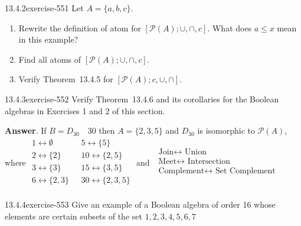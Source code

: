 \documentclass[twoside,10pt,]{book}
\numberwithin{equation}{section}
\begin{document}
\begin{divisionsolution}{13.4.2}{}{exercise-551}%
\hypertarget{p-4939}{}%
Let \(A = \{a, b, c\}\).\leavevmode%
\begin{enumerate}[label=(\alph*)]
\item\hypertarget{li-2245}{}\hypertarget{p-4940}{}%
Rewrite the definition of atom for \([\mathcal{P}(A); \cup , \cap, c ]\). What does \(a \leq  x\) mean in this example?%
\item\hypertarget{li-2246}{}\hypertarget{p-4941}{}%
Find all atoms of \([\mathcal{P}(A); \cup , \cap, c ]\).%
\item\hypertarget{li-2247}{}\hypertarget{p-4942}{}%
Verify Theorem~13.4.5 for \([\mathcal{P}(A); c, \cup , \cap ]\).%
\end{enumerate}
%
\end{divisionsolution}%
\begin{divisionsolution}{13.4.3}{}{exercise-552}%
\hypertarget{p-4943}{}%
Verify Theorem~13.4.6 and its corollaries for the Boolean algebras in Exercises 1 and 2 of this section.%
\par\smallskip%
\noindent\textbf{Answer}.\quad%
\hypertarget{p-4944}{}%
If \(B = D_{30}\textrm{ }\) 30 then \(A = \{2, 3, 5\}\) and \(D_{30}\) is isomorphic to \(\mathcal{P}(A)\), where \(\begin{array}{cc}
1\leftrightarrow \emptyset \textrm{     } & 5\leftrightarrow  \{5\} \\
2\leftrightarrow  \{2\}\textrm{     } & 10\leftrightarrow  \{2,5\} \\
3\leftrightarrow  \{3\}\textrm{     } & 15\leftrightarrow  \{3,5\} \\
6\leftrightarrow  \{2,3\}\textrm{     } & 30\leftrightarrow  \{2,3,5\} \\
\end{array}\)   and   \(\begin{array}{c}
\textrm{ Join} \leftrightarrow  \textrm{ Union} \\
\textrm{ Meet}\leftrightarrow  \textrm{ Intersection} \\
\textrm{ Complement}\leftrightarrow  \textrm{ Set} \textrm{ Complement}  \\
\end{array}\)%
\end{divisionsolution}%
\begin{divisionsolution}{13.4.4}{}{exercise-553}%
\hypertarget{p-4945}{}%
Give an example of a Boolean algebra of order 16 whose elements are certain subsets of the set \({1, 2, 3, 4, 5, 6, 7}\)%
\end{divisionsolution}%
\end{document}
